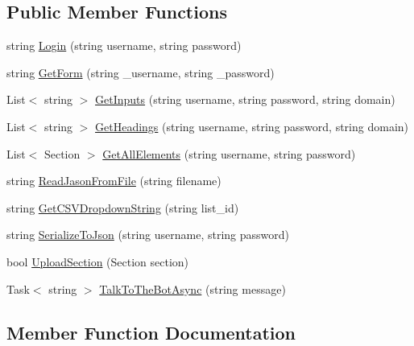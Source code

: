 \subsection*{Public Member Functions}
\begin{DoxyCompactItemize}
\item 
string \hyperlink{interface_wcf_service1_1_1_i_service1_a22c297ac3e406ff48776942e47e6ba65}{Login} (string username, string password)
\item 
string \hyperlink{interface_wcf_service1_1_1_i_service1_ab0b52fb983ee4488ad7de5f03597d186}{Get\+Form} (string \+\_\+username, string \+\_\+password)
\item 
List$<$ string $>$ \hyperlink{interface_wcf_service1_1_1_i_service1_a81d8f9d0c98959c0db9856ef015ef71c}{Get\+Inputs} (string username, string password, string domain)
\item 
List$<$ string $>$ \hyperlink{interface_wcf_service1_1_1_i_service1_a62b4a23525791f79b35325acdc9c08c1}{Get\+Headings} (string username, string password, string domain)
\item 
List$<$ Section $>$ \hyperlink{interface_wcf_service1_1_1_i_service1_aa3f75be37b97eb1f0b0630cfabc2c51c}{Get\+All\+Elements} (string username, string password)
\item 
string \hyperlink{interface_wcf_service1_1_1_i_service1_a19ff6b5fd0d71880ef89413442e3eabe}{Read\+Jason\+From\+File} (string filename)
\item 
string \hyperlink{interface_wcf_service1_1_1_i_service1_a1baba4ded4ba686dc43912639339e1a0}{Get\+C\+S\+V\+Dropdown\+String} (string list\+\_\+id)
\item 
string \hyperlink{interface_wcf_service1_1_1_i_service1_aa4b0e92420addad7422e113b7b7161e2}{Serialize\+To\+Json} (string username, string password)
\item 
bool \hyperlink{interface_wcf_service1_1_1_i_service1_a40f5fb59f7eb2c10dc216bceb4fc366c}{Upload\+Section} (Section section)
\item 
Task$<$ string $>$ \hyperlink{interface_wcf_service1_1_1_i_service1_a1d49b0b16f20bd13e61cc1bb80aa7832}{Talk\+To\+The\+Bot\+Async} (string message)
\end{DoxyCompactItemize}


\subsection{Member Function Documentation}
